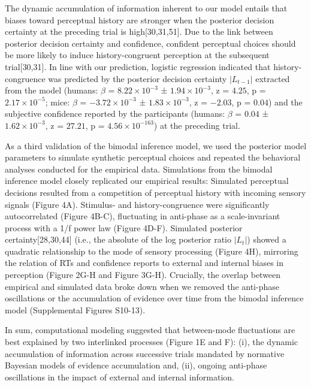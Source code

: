 \documentclass[
]{article}
\begin{document}
The dynamic accumulation of information inherent to our model entails
that biases toward perceptual history are stronger when the posterior
decision certainty at the preceding trial is high{[}30,31,51{]}. Due to
the link between posterior decision certainty and confidence, confident
perceptual choices should be more likely to induce history-congruent
perception at the subsequent trial{[}30,31{]}. In line with our
prediction, logistic regression indicated that history-congruence was
predicted by the posterior decision certainty \(|L_{t-1}|\) extracted
from the model (humans: \(\beta\) = \(\ensuremath{8.22\times 10^{-3}}\)
± \(\ensuremath{1.94\times 10^{-3}}\), z = \(4.25\), p =
\(\ensuremath{2.17\times 10^{-5}}\); mice: \(\beta\) =
\(\ensuremath{-3.72\times 10^{-3}}\) ±
\(\ensuremath{1.83\times 10^{-3}}\), z = \(-2.03\), p = \(0.04\)) and
the subjective confidence reported by the participants (humans:
\(\beta\) = \(0.04\) ± \(\ensuremath{1.62\times 10^{-3}}\), z =
\(27.21\), p = \(\ensuremath{4.56\times 10^{-163}}\)) at the preceding
trial.

As a third validation of the bimodal inference model, we used the
posterior model parameters to simulate synthetic perceptual choices and
repeated the behavioral analyses conducted for the empirical data.
Simulations from the bimodal inference model closely replicated our
empirical results: Simulated perceptual decisions resulted from a
competition of perceptual history with incoming sensory signals (Figure
4A). Stimulus- and history-congruence were significantly autocorrelated
(Figure 4B-C), fluctuating in anti-phase as a scale-invariant process
with a 1/f power law (Figure 4D-F). Simulated posterior
certainty{[}28,30,44{]} (i.e., the absolute of the log posterior ratio
\(|L_t|\)) showed a quadratic relationship to the mode of sensory
processing (Figure 4H), mirroring the relation of RTs and confidence
reports to external and internal biases in perception (Figure 2G-H and
Figure 3G-H). Crucially, the overlap between empirical and simulated
data broke down when we removed the anti-phase oscillations or the
accumulation of evidence over time from the bimodal inference model
(Supplemental Figures S10-13).

In sum, computational modeling suggested that between-mode fluctuations
are best explained by two interlinked processes (Figure 1E and F): (i),
the dynamic accumulation of information across successive trials
mandated by normative Bayesian models of evidence accumulation and,
(ii), ongoing anti-phase oscillations in the impact of external and
internal information.
\end{document}
